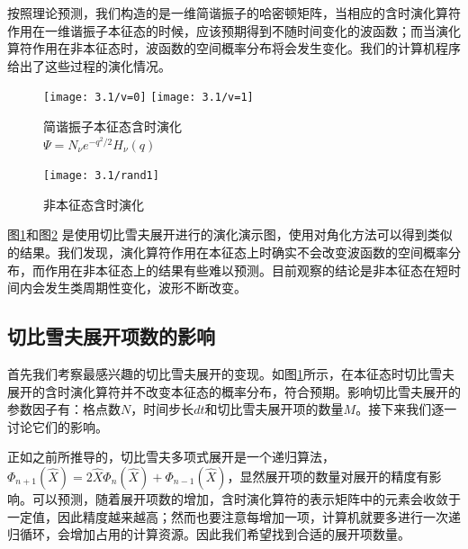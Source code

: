按照理论预测，我们构造的是一维简谐振子的哈密顿矩阵，当相应的含时演化算符作用在一维谐振子本征态的时候，应该预期得到不随时间变化的波函数；而当演化算符作用在非本征态时，波函数的空间概率分布将会发生变化。我们的计算机程序给出了这些过程的演化情况。
\begin{figure}[hbt]
  \centering
  \captionsetup{justification=centering}
  \vspace{1mm}
  \texttt{[image: 3.1/v=0]}
  \texttt{[image: 3.1/v=1]}
  \caption{简谐振子本征态含时演化 \\
            $\Psi = N_{\nu}e^{-q^2/2}H_{\nu}(q)$ \label{fig:prop1}}
\end{figure}

\begin{figure}[hbt]
  \centering
  \captionsetup{justification=centering}
  \vspace{1mm}
  \texttt{[image: 3.1/rand1]}
  \caption{非本征态含时演化  \label{fig:prop2}}
\end{figure}

图\ref{fig:prop1}和图\ref{fig:prop2} 是使用切比雪夫展开进行的演化演示图，使用对角化方法可以得到类似的结果。我们发现，演化算符作用在本征态上时确实不会改变波函数的空间概率分布，而作用在非本征态上的结果有些难以预测。目前观察的结论是非本征态在短时间内会发生类周期性变化，波形不断改变。


\subsection{切比雪夫展开项数的影响}
首先我们考察最感兴趣的切比雪夫展开的变现。如图\ref{fig:prop1}所示，在本征态时切比雪夫展开的含时演化算符并不改变本征态的概率分布，符合预期。影响切比雪夫展开的参数因子有：格点数$N$，时间步长$dt$和切比雪夫展开项的数量$M$。接下来我们逐一讨论它们的影响。

正如之前所推导的，切比雪夫多项式展开是一个递归算法，$\Phi_{n+1}(\hat{X}) = 2\hat{X}\Phi_{n}(\hat{X}) + \Phi_{n-1}(\hat{X})$，显然展开项的数量对展开的精度有影响。可以预测，随着展开项数的增加，含时演化算符的表示矩阵中的元素会收敛于一定值，因此精度越来越高；然而也要注意每增加一项，计算机就要多进行一次递归循环，会增加占用的计算资源。因此我们希望找到合适的展开项数量。

